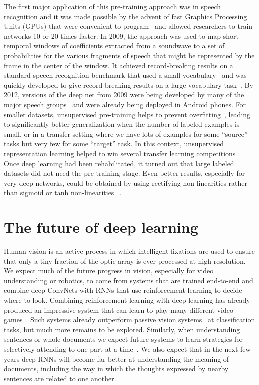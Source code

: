 \documentclass[10pts]{article}
\begin{document}
The first major application of this pre-training approach was in
speech recognition and it was made possible by the advent of fast
Graphics Processing Units (GPUs) that were convenient to
program~\citep{RainaICML09-small} and allowed researchers to train
networks 10 or 20 times faster.  In 2009, the approach was used to map
short temporal windows of coefficients extracted from a soundwave to a
set of probabilities for the various fragments of speech that might be
represented by the frame in the center of the window.  It achieved
record-breaking results on a standard speech recognition benchmark
that used a small vocabulary~\citep{TIMITpaper} and was quickly
developed to give record-breaking results on a large vocabulary
task~\citep{Dahl2012}.  By 2012, versions of the deep net from 2009
were being developed by many of the major speech
groups~\citep{Hinton-et-al-2012} and were already being deployed in
Android phones.  For smaller datasets, unsupervised pre-training helps
to prevent overfitting~\citep{Bengio-Courville-Vincent-TPAMI2013}, leading to
significantly better generalization when the number of labeled
examples is small, or in a transfer setting where we have lots of
examples for some ``source'' tasks but very few for some ``target''
task. In this context, unsupervised representation learning helped to
win several transfer learning
competitions~\citep{UTLC+LISA-2011-small,Goodfellow-icml2012}.  Once
deep learning had been rehabilitated, it turned out that large labeled
datasets did not need the pre-training stage. Even better results,
especially for very deep networks, could be obtained by using
rectifying non-linearities rather than sigmoid or tanh non-linearities
~\citep{Nair-2010-small,Glorot+al-AI-2011-small,Krizhevsky-2012-small,Dahl-et-al-ICASSP2013}.


\section{The future of deep learning}

Human vision is an active process in which intelligent fixations are
used to ensure that only a tiny fraction of the optic array is ever
processed at high resolution. We expect much of the future progress in
vision, especially for video understanding or robotics, to come from
systems that are trained end-to-end and combine deep ConvNets with
RNNs that use reinforcement learning to decide where to look.
Combining reinforcement learning with deep learning has already
produced an impressive system that can learn to play many different
video games~\citep{Mnih-et-al-2015}.  Such systems already outperform passive vision
systems~\citep{ba+mnih} at classification tasks, but much more remains to be
explored.   Similarly, when understanding sentences or
whole documents we expect future systems to learn strategies for
selectively attending to one part at a
time~\citep{Bahdanau-et-al-arxiv2014}. We also expect that in the next
few years deep RNNs will become far better at understanding the
meaning of documents, including the way in which the thoughts
expressed by nearby sentences are related to one another.
\end{document}

